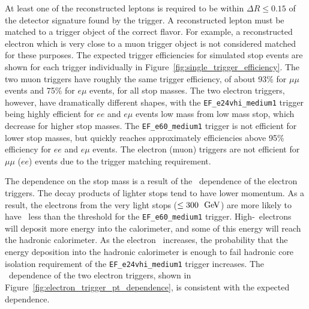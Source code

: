 \begin{table}[ht]
    \caption{Requirements for the triggers used in this analysis.  }
    \label{tab:trigger_defs}
\end{table}

At least one of the reconstructed leptons is required to be within 
$\Delta R \leq 0.15$ of the detector signature found by the trigger.
A reconstructed lepton must be matched to a trigger object of the correct flavor.
For example, a reconstructed electron which is very close to a muon trigger
object is not considered matched for these purposes.
The expected trigger efficiencies for simulated stop events are shown
for each trigger individually in Figure~\ref{fig:single_trigger_efficiency}.
The two muon triggers have roughly the same trigger efficiency, of about 93\% 
for $\mu\mu$ events and 75\% for $e\mu$ events, for all stop masses.
The two electron triggers, however, have dramatically different shapes, with
the \texttt{EF\_e24vhi\_medium1} trigger being highly efficient for $ee$ and
$e\mu$ events low mass from low mass stop, which decrease for higher
stop masses. 
The \texttt{EF\_e60\_medium1} trigger is not efficient for lower stop
masses, but quickly reaches approximately efficiencies above 95\% efficiency for
$ee$ and $e\mu$ events.
The electron (muon) triggers are not efficient for $\mu\mu$ ($ee$) events due
to the trigger matching requirement.

The dependence on the stop mass is a result of the \ET\ dependence of the
electron triggers.
The decay products of lighter stops tend to have lower momentum.
As a result, the electrons from the very light stops ($\leq 300~\GeV$) 
are more likely to have \ET\ less than the threshold for the
\texttt{EF\_e60\_medium1} trigger.
High-\HT\ electrons will deposit more energy into the calorimeter,
and some of this energy will reach the hadronic calorimeter.
As the electron \HT\ increases, the probability that the energy deposition into
the hadronic calorimeter is enough to fail hadronic core isolation requirement
of the \texttt{EF\_e24vhi\_medium1} trigger increases.
The \ET\ dependence of the two electron triggers, shown in
Figure~\ref{fig:electron_trigger_pt_dependence}, is consistent with the expected
dependence.

